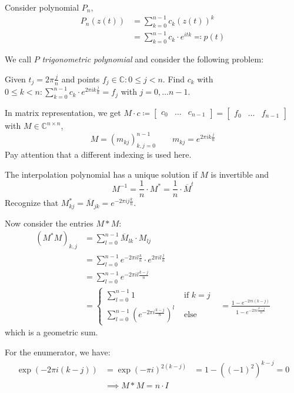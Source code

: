 \documentclass[a4paper]{article}
\numberwithin{lecref}{section}
\theoremstyle{break}
\begin{document}
Consider polynomial $P_n$,
\begin{align*}
  P_n(z(t)) &= \sum_{k=0}^{n-1} c_k(z(t))^k \\
    &= \sum_{k=0}^{n-1} c_k \cdot e^{itk} \eqqcolon p(t)
\end{align*}

We call $P$ \emph{trigonometric polynomial} and consider the following problem:

Given $t_j = 2\pi \frac jn$ and points $f_j \in \mathbb C: 0 \leq j < n$.
Find $c_k$ with $0 \leq k < n: \sum_{k=0}^{n-1} c_k \cdot e^{2\pi ik \frac jn} = f_j$ with $j = 0, \dots n-1$.

In matrix representation, we get $M \cdot c \coloneqq \begin{bmatrix} c_0 & \dots & c_{n-1} \end{bmatrix} = \begin{bmatrix} f_0 & \dots & f_{n-1} \end{bmatrix}$ with $M \in \mathbb C^{n\times n}$,
\[ M = (m_{kj})_{k,j=0}^{n-1} \qquad m_{kj} = e^{2 \pi i k \frac jn} \]
Pay attention that a different indexing is used here.

The interpolation polynomial has a unique solution if $M$ is invertible and
\[ M^{-1} = \frac 1n \cdot M^* = \frac 1n \cdot \overline{M}^t \]
Recognize that $M^*_{kj} = \overline{M}_{jk} = e^{-2\pi ij \frac kn}$.

Now consider the entries $M*M$:
\begin{align*}
  (M^* M)_{k,j} &= \sum_{l=0}^{n-1} \overline{M}_{lk} \cdot M_{lj} \\
    &= \sum_{l=0}^{n-1} e^{-2\pi il \frac kn} \cdot e^{2\pi il \frac jn} \\
    &= \sum_{l=0}^{n-1} e^{-2\pi il \frac{k - j}{n}} \\
    &= \begin{cases}
      \sum_{l=0}^{n-1} 1 & \text{ if } k = j \\
      \sum_{l=0}^{n-1} \left(e^{-2\pi i \frac{k - j}{n}}\right)^l & \text{ else}
    \end{cases}
    &= \frac{1 - e^{-2 \pi i (k-j)}}{1 - e^{-2 \pi i \frac{k-j}{n}}}
\end{align*}
which is a geometric sum.

For the enumerator, we have:
\begin{align*}
  \exp(-2\pi i (k-j)) &= \exp(-\pi i)^{2(k-j)}
    &= 1 - ((-1)^2)^{k-j} = 0 \\
    &\implies M* M = n \cdot I
\end{align*}
\end{document}
